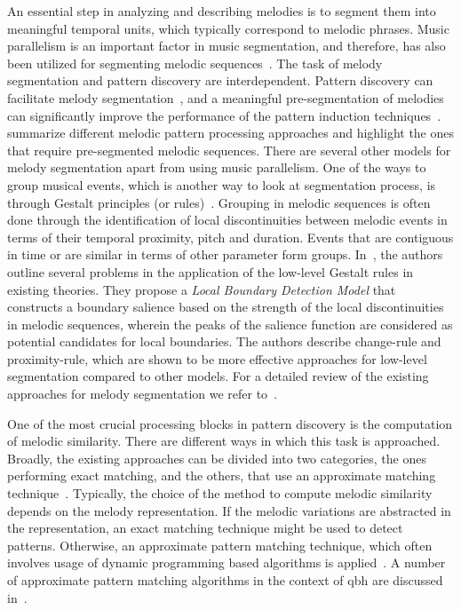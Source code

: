 An essential step in analyzing and describing melodies is to segment them into meaningful temporal units, which typically correspond to melodic phrases. Music parallelism is an important factor in music segmentation, and therefore, has also been utilized for segmenting melodic sequences~\citep{Cambouropoulos2006}. The task of melody segmentation and pattern discovery are interdependent. Pattern discovery can facilitate melody segmentation~\citep{Cambouropoulos2006}, and a meaningful pre-segmentation of melodies can significantly improve the performance of the pattern induction techniques~\citep{hiraga1997structural}. \cite{cambouropoulos2001pattern} summarize different melodic pattern processing approaches and highlight the ones that require pre-segmented melodic sequences. There are several other models for melody segmentation apart from using music parallelism. One of the ways to group musical events, which is another way to look at segmentation process, is through Gestalt principles (or rules)~\citep{Lerdahl1983,tenney1980temporal}. Grouping in melodic sequences is often done through the identification of local discontinuities between melodic events in terms of their temporal proximity, pitch and duration. Events that are contiguous in time or are similar in terms of other parameter form groups. In~\cite{cambouropoulos1996formal,cambouropoulos2001local}, the authors outline several problems in the application of the low-level Gestalt rules in existing theories. They propose a \textit{Local Boundary Detection Model} that constructs a boundary salience based on the strength of the local discontinuities in melodic sequences, wherein the peaks of the salience function are considered as potential candidates for local boundaries. The authors describe change-rule and proximity-rule, which are shown to be more effective approaches for low-level segmentation compared to other models. For a detailed review of the existing approaches for melody segmentation we refer to~\cite{cambouropoulos2001pattern}.

One of the most crucial processing blocks in pattern discovery is the computation of melodic similarity. There are different ways in which this task is approached. Broadly, the existing approaches can be divided into two categories, the ones performing exact matching, and the others, that use an approximate matching technique~\citep{cambouropoulos2001pattern}. Typically, the choice of the method to compute melodic similarity depends on the melody representation. If the melodic variations are abstracted in the representation, an exact matching technique might be used to detect patterns. Otherwise, an approximate pattern matching technique, which often involves usage of dynamic programming based algorithms is applied~\citep{rolland1999discovering}. A number of approximate pattern matching algorithms in the context of \gls{qbh} are discussed in~. 


